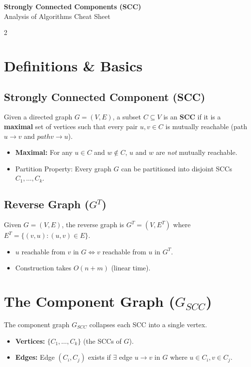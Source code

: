 \documentclass[a4paper,10pt]{article}
\begin{document}
\begin{center}
    {\Huge \textbf{Strongly Connected Components (SCC)}} \\
    {\large Analysis of Algorithms Cheat Sheet}
\end{center}

\begin{multicols}{2}

\section{Definitions \& Basics}

\subsection{Strongly Connected Component (SCC)}
Given a directed graph $G=(V,E)$, a subset $C \subseteq V$ is an \textbf{SCC} if it is a \textbf{maximal} set of vertices such that every pair $u, v \in C$ is mutually reachable (path $u \to v$ and $path v \to u$).
\begin{itemize}
    \item \textbf{Maximal:} For any $u \in C$ and $w \notin C$, $u$ and $w$ are \textit{not} mutually reachable.
    \item Partition Property: Every graph $G$ can be partitioned into disjoint SCCs $C_1, \dots, C_k$.
\end{itemize}

\subsection{Reverse Graph ($G^T$)}
Given $G=(V,E)$, the reverse graph is $G^T = (V, E^T)$ where $E^T = \{(v,u) : (u,v) \in E\}$.
\begin{itemize}
    \item $u$ reachable from $v$ in $G \iff v$ reachable from $u$ in $G^T$.
    \item Construction takes $O(n+m)$ (linear time).
\end{itemize}

\section{The Component Graph ($G_{SCC}$)}

The component graph $G_{SCC}$ collapses each SCC into a single vertex.
\begin{itemize}
    \item \textbf{Vertices:} $\{C_1, \dots, C_k\}$ (the SCCs of $G$).
    \item \textbf{Edges:} Edge $(C_i, C_j)$ exists if $\exists$ edge $u \to v$ in $G$ where $u \in C_i, v \in C_j$.
\end{itemize}


\end{multicols}
\end{document}
